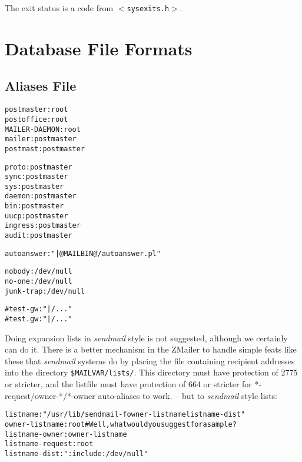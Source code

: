 The exit status is a code from {\tt {\(<\)}sysexits.h{\(>\)}}.



\section{Database File Formats}



\subsection{Aliases File}



\begin{alltt}
postmaster: root
postoffice: root
MAILER-DAEMON: root
mailer:     postmaster
postmast:   postmaster

proto:  postmaster
sync:   postmaster
sys:    postmaster
daemon: postmaster
bin:    postmaster
uucp:   postmaster
ingress: postmaster
audit:  postmaster

autoanswer: "|@MAILBIN@/autoanswer.pl"

nobody: /dev/null
no-one: /dev/null
junk-trap: /dev/null

#test-gw: "|/..."
#test.gw: "|/..."
\end{alltt}

Doing expansion lists in {\em sendmail} style is not suggested, although
we certainly can do it.  There is a better mechanism in the ZMailer
to handle simple feats like these that {\em sendmail} systems do by placing
the file containing recipient addresses into the directory  
{\tt \$MAILVAR/lists/}.
This directory must have protection of 2775 or stricter, and the listfile
must have protection of 664 or stricter for *-request/owner-*/*-owner
auto-aliases to work. -- but to {\em sendmail} style lists:

\begin{alltt}
listname: "/usr/lib/sendmail -fowner-listname listname-dist"
owner-listname: root # Well, what would you suggest for a sample ?
listname-owner: owner-listname
listname-request: root
listname-dist: ":include:/dev/null"
\end{alltt}
